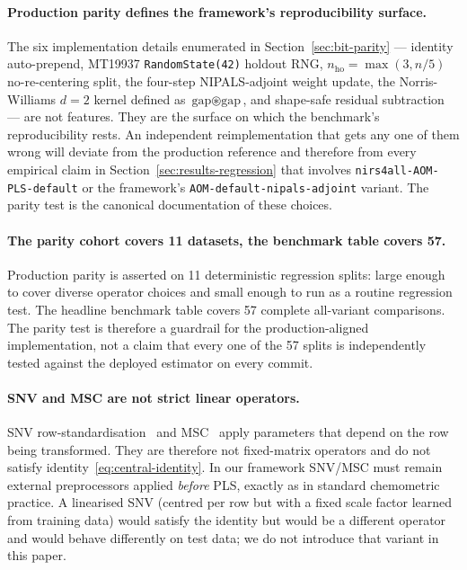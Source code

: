 \documentclass[review,a4paper]{elsarticle}
\newcommand{\PLS}{\textsc{PLS}\xspace}
\newcommand{\NIPALS}{\textsc{NIPALS}\xspace}
\begin{document}
\paragraph{Production parity defines the framework's reproducibility surface.}
The six implementation details enumerated in Section~\ref{sec:bit-parity}
--- identity auto-prepend, MT19937 \verb|RandomState(42)| holdout RNG,
$n_\text{ho}=\max(3, n/5)$ no-re-centering split, the four-step
\NIPALS-adjoint weight update, the Norris-Williams $d{=}2$ kernel
defined as $\text{gap}\circledast\text{gap}$, and shape-safe residual
subtraction --- are not features. They are the surface on which the
benchmark's reproducibility rests. An independent reimplementation
that gets any one of them wrong will deviate from the production
reference and therefore from every empirical claim in
Section~\ref{sec:results-regression} that involves
\verb|nirs4all-AOM-PLS-default| or the framework's
\texttt{AOM-default-nipals-adjoint} variant. The parity test is the canonical
documentation of these choices.

\paragraph{The parity cohort covers 11 datasets, the benchmark table covers 57.}
Production parity is asserted on 11 deterministic regression splits:
large enough to cover diverse operator choices and small enough to run
as a routine regression test. The headline benchmark table covers 57
complete all-variant comparisons. The parity test is therefore a
guardrail for the production-aligned implementation, not a claim that
every one of the 57 splits is independently tested against the deployed
estimator on every commit.

\paragraph{SNV and MSC are not strict linear operators.}
SNV row-standardisation~\cite{barnes1989standard} and
MSC~\cite{geladi1985linearization} apply parameters that depend on the
row being transformed. They are therefore not fixed-matrix operators
and do not satisfy identity~\eqref{eq:central-identity}. In our
framework SNV/MSC must remain external preprocessors applied
\emph{before} \PLS, exactly as in standard chemometric practice. A
linearised SNV (centred per row but with a fixed scale factor learned
from training data) would satisfy the identity but would be a
different operator and would behave differently on test data; we do
not introduce that variant in this paper.
\end{document}
